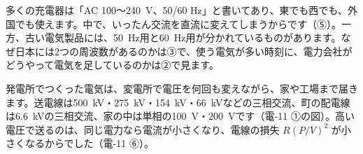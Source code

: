 \noindent 多くの充電器は「AC 100〜\qty{240}{V}、50/60 Hz」と書いてあり、東でも西でも、外国でも使えます。中で、いったん交流を直流に変えてしまうからです（⑤）。一方、古い電気製品には、\qty{50}{Hz}用と\qty{60}{Hz}用が分かれているものがあります。なぜ日本には2つの周波数があるのかは③で、使う電気が多い時刻に、電力会社がどうやって電気を足しているのかは②で見ます。

\begin{omoidasou}
\end{omoidasou}


\leavevmode\label{ph:電-16:sec1}発電所でつくった電気は、変電所で電圧を何回も変えながら、家や工場まで届きます。送電線は\qty{500}{kV}・\qty{275}{kV}・\qty{154}{kV}・\qty{66}{kV}などの三相交流、町の配電線は\qty{6.6}{kV}の三相交流、家の中は単相の\qty{100}{V}・\qty{200}{V}です（電-11 ①の図）。高い電圧で送るのは、同じ電力なら電流が小さくなり、電線の損失 $R(P/V)^2$ が小さくなるからでした（電-11 ⑥）。

